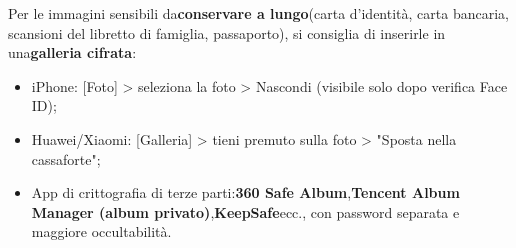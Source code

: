 Per le immagini sensibili da\textbf{conservare a lungo}(carta d'identità, carta bancaria, scansioni del libretto di famiglia, passaporto), si consiglia di inserirle in una\textbf{galleria cifrata}:

\begin{itemize}
  \item iPhone: [Foto] > seleziona la foto > Nascondi (visibile solo dopo verifica Face ID);
  \item Huawei/Xiaomi: [Galleria] > tieni premuto sulla foto > "Sposta nella cassaforte";
  \item App di crittografia di terze parti:\textbf{360 Safe Album},\textbf{Tencent Album Manager (album privato)},\textbf{KeepSafe}ecc., con password separata e maggiore occultabilità.
\end{itemize}
